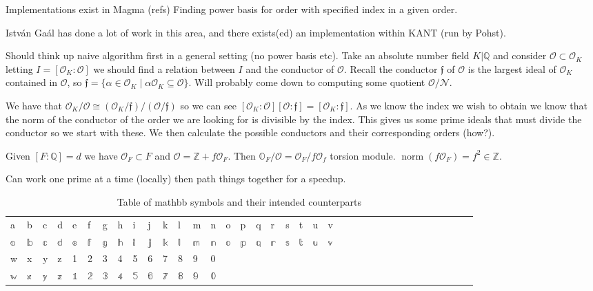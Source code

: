 \documentclass[11pt,a4paper]{article}
\begin{document}
\maketitle

Implementations exist in Magma (refs)
Finding power basis for order with specified index in a given order.

Istv\'an Ga\'al has done a lot of work in this area, and there exists(ed) an implementation within KANT (run by Pohst).

Should think up naive algorithm first in a general setting (no power basis etc).
Take an absolute number field $K|\mathbb{Q}$ and consider $\mathcal{O}\subset \mathcal{O}_K$ letting $I=[\mathcal{O}_K:\mathcal{O}]$ we should find a relation between $I$ and the conductor of $\mathcal{O}$.
Recall the conductor $\mathfrak{f}$ of $\mathcal{O}$ is the largest ideal of $\mathcal{O}_K$ contained in $\mathcal{O}$, so $\mathfrak{f} = \{\alpha\in\mathcal{O}_K\mid \alpha\mathcal{O}_K\subseteq \mathcal{O}\}$.
Will probably come down to computing some quotient $\mathcal{O}/\mathcal{N}$.

We have that $\mathcal{O}_K/\mathcal{O}\cong (\mathcal{O}_K/\mathfrak{f})/(\mathcal{O}/\mathfrak{f})$ so we can see $[\mathcal{O}_K:\mathcal{O}][\mathcal{O}:\mathfrak{f}] = [\mathcal{O}_K:\mathfrak{f}]$.
As we know the index we wish to obtain we know that the norm of the conductor of the order we are looking for is divisible by the index.
This gives us some prime ideals that must divide the conductor so we start with these.
We then calculate the possible conductors and their corresponding orders (how?).

Given $[F:\mathbb{Q}] = d$ we have $\mathcal{O}_F\subset F$ and $\mathcal{O} = \mathbb{Z} + f\mathcal{O}_F$.
Then $\mathbb{O}_F/\mathcal{O} = \mathcal{O}_F/f\mathcal{O}_f$ torsion module.
$\operatorname{norm}(f\mathcal{O}_F) = f^2 \in \mathbb{Z}$.

Can work one prime at a time (locally) then path things together for a speedup.

\begin{table}[h]
\begin{tabular}{llllllllllllllllllllllllllllllllllll}
a&b&c&d&e&f&g&h&i&j&k&l&m&n&o&p&q&r&s&t&u&v\\
$\mathbb{a}$&$\mathbb{b}$&$\mathbb{c}$&$\mathbb{d}$&$\mathbb{e}$&$\mathbb{f}$&$\mathbb{g}$&$\mathbb{h}$&$\mathbb{i}$&$\mathbb{j}$&$\mathbb{k}$&$\mathbb{l}$&$\mathbb{m}$&$\mathbb{n}$&$\mathbb{o}$&$\mathbb{p}$&$\mathbb{q}$&$\mathbb{r}$&$\mathbb{s}$&$\mathbb{t}$&$\mathbb{u}$&$\mathbb{v}$\\
w&x&y&z&1&2&3&4&5&6&7&8&9&0 \\
$\mathbb{w}$&$\mathbb{x}$&$\mathbb{y}$&$\mathbb{z}$&$\mathbb{1}$&$\mathbb{2}$&$\mathbb{3}$&$\mathbb{4}$&$\mathbb{5}$&$\mathbb{6}$&$\mathbb{7}$&$\mathbb{8}$&$\mathbb{9}$&$\mathbb{0}$ \\
\end{tabular}
\caption{\label{}Table of mathbb symbols and their intended counterparts}
\end{table}
\end{document}
